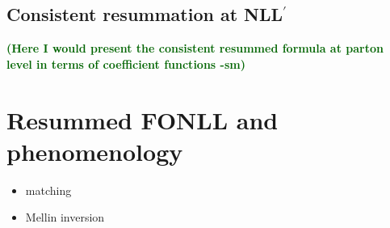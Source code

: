 \documentclass[letterpaper,11pt]{article}
\newcommand{\sm}[1]{\textbf{\textcolor{darkgreen}{(#1 -sm)}}}
\begin{document}
\subsection{Consistent resummation at NLL$^\prime$}

\sm{Here I would present the consistent resummed formula at parton level in terms of coefficient functions}

\section{Resummed FONLL and phenomenology}

\begin{itemize}
\item matching
\item Mellin inversion
\end{itemize}
\end{document}
